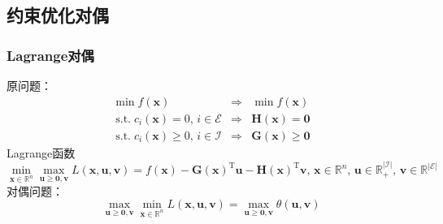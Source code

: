 \subsection{约束优化对偶}
\subsubsection{Lagrange对偶}
原问题：
\[
    \begin{array}{lcr}
        \min f(\boldsymbol{x}) & \Longrightarrow & \min f(\boldsymbol{x}) \\
        \operatorname{s.t.} c_{i}(\boldsymbol{x}) = 0,\,i\in \mathcal{E} & \Longrightarrow & \boldsymbol{H}(\boldsymbol{x}) = \boldsymbol{0} \\
        \operatorname{s.t.} c_{i}(\boldsymbol{x}) \geqslant 0,\,i\in \mathcal{I} & \Longrightarrow & \boldsymbol{G}(\boldsymbol{x}) \geqslant \boldsymbol{0}
    \end{array}
\]
Lagrange函数
\[
    \min_{\boldsymbol{x}\in\mathbb{R}^n}\max_{\boldsymbol{u}\geqslant \boldsymbol{0},\boldsymbol{v}}L(\boldsymbol{x},\boldsymbol{u},\boldsymbol{v}) = f(\boldsymbol{x})-\boldsymbol{G}(\boldsymbol{x})^{\mathrm{T}}\boldsymbol{u}-\boldsymbol{H}(\boldsymbol{x})^{\mathrm{T}}\boldsymbol{v},\,\boldsymbol{x}\in\mathbb{R}^n,\,\boldsymbol{u}\in \mathbb{R}_{+}^{|\mathcal{I}|},\,\boldsymbol{v}\in\mathbb{R}^{|\mathcal{E}|}
\]
对偶问题：
\[
    \max_{\boldsymbol{u}\geqslant \boldsymbol{0},\boldsymbol{v}}\min_{\boldsymbol{x}\in\mathbb{R}^n}L(\boldsymbol{x},\boldsymbol{u},\boldsymbol{v}) = \max_{\boldsymbol{u}\geqslant \boldsymbol{0},\boldsymbol{v}} \theta(\boldsymbol{u},\boldsymbol{v})
\]
